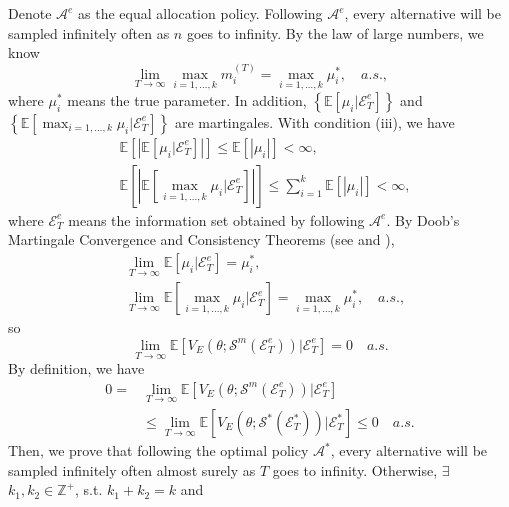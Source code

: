 \documentclass[journal]{IEEEtran}
\begin{document}
      \begin{IEEEproof} Denote $\mathcal{A}^e$ as the equal allocation policy. Following $\mathcal{A}^e$, every alternative will be sampled infinitely often as $n$ goes to infinity. By the law of large numbers, we know
               $$\lim_{T\to\infty}\max_{i=1,\ldots,k} m_i^{(T)}=\max_{i=1,\ldots,k} \mu_i^{*},\quad a.s.,$$
               where $\mu_i^{*}$ means the true parameter. 
                In addition, $\left\{\mathbb{E}[\mu_i|\mathcal{E}_T^e]\right\}$ and $\left\{\mathbb{E}[\max_{i=1,\ldots,k}\mu_i|\mathcal{E}_T^e]\right\}$ are martingales. With condition (iii), we have 
                \begin{align*}&\mathbb{E}\left[\left|\mathbb{E}\left[\mu_i|\mathcal{E}_T^e\right]\right|\right]\leq \mathbb{E}\left[|\mu_i|\right]<\infty,\\
                &\mathbb{E}\left[\left|\mathbb{E}\left[\max_{i=1,\ldots,k}\mu_i|\mathcal{E}_T^e\right]\right|\right]\leq \sum_{i=1}^{k}\mathbb{E}\left[|\mu_i|\right]<\infty,\end{align*}
                where $\mathcal{E}_T^{e}$ means the information set obtained by following  $\mathcal{A}^{e}$.
                By Doob's Martingale Convergence and Consistency Theorems (see \cite{doob1953stochastic} and \cite{van2000asymptotic}), 
                \begin{align*}&\lim_{T\to\infty}\mathbb{E}\left[\mu_i|\mathcal{E}_T^e\right]=\mu_i^{*} ,\\ &\lim_{T\to\infty}\mathbb{E}\left[\max_{i=1,\ldots,k}\mu_i|\mathcal{E}_T^e\right]=\max_{i=1,\ldots,k}\mu_i^{*},\quad a.s.,\end{align*}
                so 
                $$\lim_{T\to\infty}\mathbb{E}\left[ V_{E}(\theta;\mathcal{S}^m(\mathcal{E}_T^e))|\mathcal{E}_T^{e}\right]=0\quad a.s.$$
                By definition, we have 
                  \begin{align*}
                  0=& \lim_{T\to\infty}\mathbb{E}\left[ V_{E}(\theta;\mathcal{S}^m(\mathcal{E}_T^e))|\mathcal{E}_T^{e}\right]\\
                  &\leq \lim_{T\to\infty}\mathbb{E}\left[ V_{E}(\theta;\mathcal{S}^{*}(\mathcal{E}_T^{*}))|\mathcal{E}_T^{*}\right]\leq 0\quad a.s.\end{align*}
                  Then, we prove that following the optimal policy $\mathcal{A}^{*}$, every alternative will be sampled infinitely often  almost surely as $T$ goes to infinity. Otherwise, $\exists$ $k_1,k_2\in\mathbb{Z}^{+}$, s.t. $k_1+k_2=k$ and 
                  \begin{align*}

\end{align*}
\end{IEEEproof}
\end{document}
